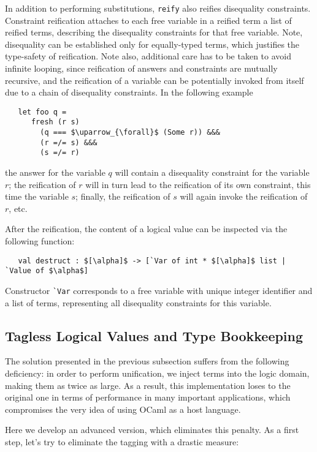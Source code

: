 In addition to performing substitutions, \lstinline|reify| also reifies disequality constraints. Constraint reification
attaches to each free variable in a reified term a list of reified terms, describing the disequality constraints for that
free variable. Note, disequality can be established only for equally-typed terms, which justifies the type-safety of reification.
Note also, additional care has to be taken to avoid infinite looping, since reification of answers and constraints are
mutually recursive, and the reification of a variable can be potentially invoked from itself due to a chain of disequality
constraints. In the following example

\begin{lstlisting}
   let foo q =
      fresh (r s)
        (q === $\uparrow_{\forall}$ (Some r)) &&&
        (r =/= s) &&&
        (s =/= r)
\end{lstlisting}

\noindent the answer for the variable $q$ will contain a disequality constraint for the variable $r$; the reification of $r$ will in turn
lead to the reification of its own constraint, this time the variable $s$; finally, the reification of $s$ will again invoke the
reification of $r$, etc.

After the reification, the content of a logical value can be inspected via the following function:

\begin{lstlisting}
   val destruct : $[\alpha]$ -> [`Var of int * $[\alpha]$ list | `Value of $\alpha$]
\end{lstlisting}

Constructor \lstinline{`Var} corresponds to a free variable with unique integer identifier and a list of terms,
representing all disequality constraints for this variable.

\subsection{Tagless Logical Values and Type Bookkeeping}

The solution presented in the previous subsection suffers from the following deficiency: in order to perform unification,
we inject terms into the logic domain, making them as twice as large. As a result, this implementation loses to the original one in
terms of performance in many important applications, which compromises the very idea of using OCaml as a host language.

Here we develop an advanced version, which eliminates this penalty. As a first step, let's try to eliminate the tagging with
a drastic measure:


